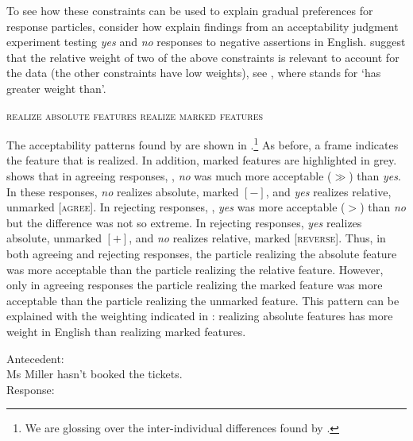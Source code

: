 \documentclass[output=paper,colorlinks,citecolor=brown]{langscibook}
\begin{document}
To see how these constraints can be used to explain gradual preferences for response particles, consider how \citet{ReppMeijerScherf2019} explain findings from an acceptability judgment experiment testing \textit{yes} and \textit{no} responses to negative assertions in English. \citeauthor{ReppMeijerScherf2019} suggest that the relative weight of two of the above constraints is relevant to account for the data (the other constraints have low weights), see , where  stands for ‘has greater weight than’.

\ea\label{geist-repp:ex:absolute-marked-features}
\textsc{realize absolute features}  \textsc{realize marked features}
\z

\noindent The acceptability patterns found by \citeauthor{ReppMeijerScherf2019} are shown in .\footnote{We are glossing over the inter-individual differences found by \citet{ReppMeijerScherf2019}.}  As before, a frame indicates the feature that is realized. In addition, marked features are highlighted in grey.  shows that in agreeing responses, , \textit{no} was much more acceptable ($\gg$) than \textit{yes}. In these responses, \textit{no} realizes absolute, marked $[-]$, and \textit{yes} realizes relative, unmarked [\textsc{agree}]. In rejecting responses, , \textit{yes} was more acceptable ($>$) than \textit{no} but the difference was not so extreme. In rejecting responses, \textit{yes} realizes absolute, unmarked $[+]$, and \textit{no} realizes relative, marked [\textsc{reverse}]. Thus, in both agreeing and rejecting responses, the particle realizing the absolute feature was more acceptable than the particle realizing the relative feature. However, only in agreeing responses the particle realizing the marked feature was more acceptable than the particle realizing the unmarked feature. This pattern can be explained with the weighting indicated in : realizing absolute features has more weight in English than realizing marked features.  

\ea\label{geist-repp:ex:MsMiller-tickets2}
Antecedent:	\\
Ms Miller hasn't booked the tickets.\medskip\\
Response:
\z
\z
\end{document}

